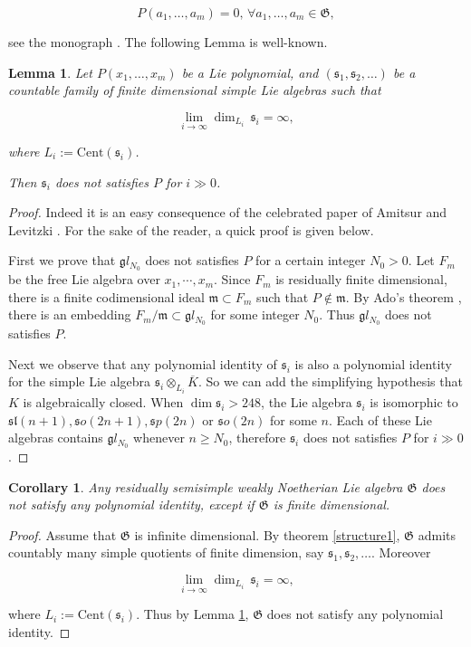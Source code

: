 \documentclass[11pt, letterpaper, reqno]{amsart}
\newtheorem{cor}[theorem]{Corollary}
\newtheorem{lemma}[theorem]{Lemma}
\theoremstyle{definition}
\newcommand{\fgl}{\mathfrak gl}
\newcommand{\fso}{\mathfrak so}
\newcommand{\fsp}{\mathfrak sp}
\newcommand{\fsl}{\mathfrak{sl}}
\newcommand{\fm}{\mathfrak{m}}
\newcommand{\fs}{\mathfrak{s}}
\newcommand{\fG}{\mathfrak{G}}
\newcommand{\Cent}{\mathrm{Cent}}
\begin{document}
$$P(a_1,\ldots,a_m)=0, \,\forall a_1,\ldots, a_m\in \fG,$$

\noindent see the monograph \cite{Bahturin}. The following Lemma is well-known. 

\begin{lemma} \label{noidentity}
 Let $P(x_1,\ldots,x_m)$ be a Lie
polynomial, and 
$(\fs_1, \fs_2,\ldots )$ be a countable family of finite dimensional simple Lie algebras such that

$$\lim_{i \to \infty}\dim_{L_i}\,\fs_i=\infty,$$

\noindent where $L_i:=\Cent(\fs_i)$.

Then $\fs_i$ does not satisfies $P$ for $i\gg0$.
\end{lemma}

\begin{proof} Indeed it is an easy consequence of
the celebrated paper of Amitsur and Levitzki
\cite{Amitsur-Levitzki}. For the sake of the reader, a quick proof is given below.

First we prove that
$\fgl_{N_0}$ does not satisfies 
$P$ for a certain integer $N_0>0$.
Let $F_m$ be the free Lie algebra over
$x_1,\cdots,x_m$. Since $F_m$ is residually finite dimensional, there is a finite codimensional ideal  $\fm\subset F_m$ such that
$P\notin\fm$. By Ado's theorem \cite{Bourbaki}, there is an embedding 
$F_m/\fm\subset \fgl_{N_0}$ for some integer $N_0$.
Thus $\fgl_{N_0}$ does not satisfies  $P$.

Next we observe that any polynomial identity 
of $\fs_i$ is also a polynomial identity for
the simple Lie algebra $\fs_i\otimes_{L_i} \overline{K}$. So we can add the simplifying hypothesis that $K$ is algebraically closed.
When $\dim \fs_i>248$, the Lie algebra
$\fs_i$ is isomorphic to 
$\fsl(n+1), \fso(2n+1), \fsp(2n)$ or $\fso(2n)$
for some $n$. Each of these Lie algebras contains $\fgl_{N_0}$ whenever $n\geq N_0$, therefore $\fs_i$ does not satisfies $P$ for $i\gg0$. 
\end{proof}


\begin{cor}\label{noPI} 
Any   residually semisimple weakly Noetherian
Lie algebra  $\fG$ does not satisfy any polynomial identity, except if $\fG$ is finite dimensional.
\end{cor} 

\begin{proof} Assume that $\fG$ is infinite dimensional.
By theorem \ref{structure1},
$\fG$ admits countably many simple quotients 
of finite dimension, say $\fs_1, \fs_2,\ldots$.
Moreover 

$$\lim_{i \to \infty}\dim_{L_i}\,\fs_i=\infty,$$

\noindent where $L_i:=\Cent(\fs_i)$. Thus by
Lemma \ref{noidentity}, $\fG$ does not satisfy any polynomial identity.
\end{proof}
\end{document}
